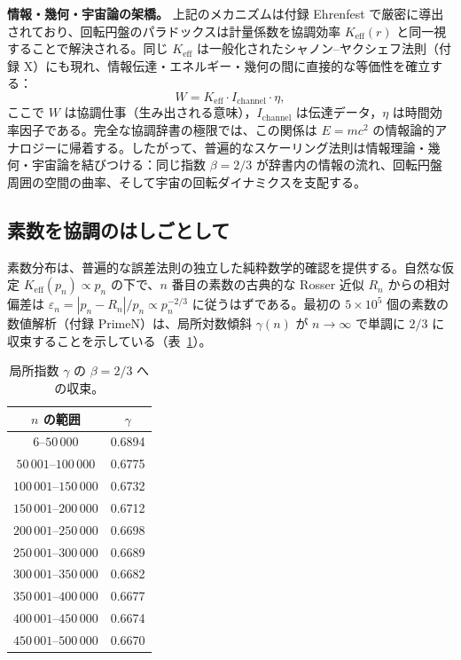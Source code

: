 \documentclass[11pt,a4paper]{article}
\begin{document}
	\textbf{情報・幾何・宇宙論の架橋。}
	上記のメカニズムは付録 Ehrenfest で厳密に導出されており、回転円盤のパラドックスは計量係数を協調効率 \(K_{\mathrm{eff}}(r)\) と同一視することで解決される。同じ \(K_{\mathrm{eff}}\) は一般化されたシャノン–ヤクシェフ法則（付録 X）にも現れ、情報伝達・エネルギー・幾何の間に直接的な等価性を確立する：
	\begin{equation}
		W = K_{\mathrm{eff}} \cdot I_{\text{channel}} \cdot \eta,
	\end{equation}
	ここで \(W\) は協調仕事（生み出される意味），\(I_{\text{channel}}\) は伝達データ，\(\eta\) は時間効率因子である。完全な協調辞書の極限では、この関係は \(E = mc^2\) の情報論的アナロジーに帰着する。したがって、普遍的なスケーリング法則は情報理論・幾何・宇宙論を結びつける：同じ指数 \(\beta = 2/3\) が辞書内の情報の流れ、回転円盤周囲の空間の曲率、そして宇宙の回転ダイナミクスを支配する。
	
	\subsection{素数を協調のはしごとして}
	
	素数分布は、普遍的な誤差法則の独立した純粋数学的確認を提供する。自然な仮定 \(K_{\mathrm{eff}}(p_n) \propto p_n\) の下で、\(n\) 番目の素数の古典的な Rosser 近似 \(R_n\) からの相対偏差は \(\varepsilon_n = |p_n - R_n|/p_n \propto p_n^{-2/3}\) に従うはずである。最初の \(5\times10^5\) 個の素数の数値解析（付録 PrimeN）は、局所対数傾斜 \(\gamma(n)\) が \(n\to\infty\) で単調に \(2/3\) に収束することを示している（表~\ref{tab:prime-slopes}）。
	
	\begin{table}[H]
		\centering
		\caption{局所指数 \(\gamma\) の \(\beta = 2/3\) への収束。}
		\label{tab:prime-slopes}
		\begin{tabular}{c c}
			\toprule
			\(n\) の範囲 & \(\gamma\) \\
			\midrule
			\(6\)--\(50\,000\)    & 0.6894 \\
			\(50\,001\)--\(100\,000\) & 0.6775 \\
			\(100\,001\)--\(150\,000\)& 0.6732 \\
			\(150\,001\)--\(200\,000\)& 0.6712 \\
			\(200\,001\)--\(250\,000\)& 0.6698 \\
			\(250\,001\)--\(300\,000\)& 0.6689 \\
			\(300\,001\)--\(350\,000\)& 0.6682 \\
			\(350\,001\)--\(400\,000\)& 0.6677 \\
			\(400\,001\)--\(450\,000\)& 0.6674 \\
			\(450\,001\)--\(500\,000\)& 0.6670 \\
			\bottomrule
		\end{tabular}
	\end{table}
	
\end{document}
